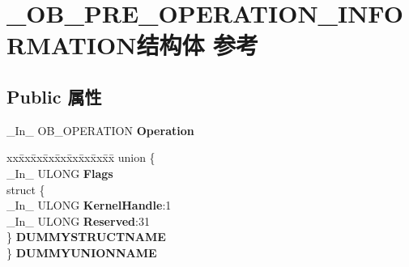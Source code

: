 \hypertarget{struct___o_b___p_r_e___o_p_e_r_a_t_i_o_n___i_n_f_o_r_m_a_t_i_o_n}{}\section{\+\_\+\+O\+B\+\_\+\+P\+R\+E\+\_\+\+O\+P\+E\+R\+A\+T\+I\+O\+N\+\_\+\+I\+N\+F\+O\+R\+M\+A\+T\+I\+O\+N结构体 参考}
\label{struct___o_b___p_r_e___o_p_e_r_a_t_i_o_n___i_n_f_o_r_m_a_t_i_o_n}
\subsection*{Public 属性}
\begin{DoxyCompactItemize}
\item 
\mbox{\label{struct___o_b___p_r_e___o_p_e_r_a_t_i_o_n___i_n_f_o_r_m_a_t_i_o_n_a38646aa82e446413e5a657d1816305b7}} 
\+\_\+\+In\+\_\+ O\+B\+\_\+\+O\+P\+E\+R\+A\+T\+I\+ON {\bfseries Operation}
\item 
\mbox{\label{struct___o_b___p_r_e___o_p_e_r_a_t_i_o_n___i_n_f_o_r_m_a_t_i_o_n_af734321385d0c964e72e2d265d4ee7e9}} 
\begin{tabbing}
xx\=xx\=xx\=xx\=xx\=xx\=xx\=xx\=xx\=\kill
union \{\\
\>\_In\_ ULONG {\bfseries Flags}\\
\>struct \{\\
\>\>\_In\_ ULONG {\bfseries KernelHandle}:1\\
\>\>\_In\_ ULONG {\bfseries Reserved}:31\\
\>\} {\bfseries DUMMYSTRUCTNAME}\\
\} {\bfseries DUMMYUNIONNAME}\\


\end{tabbing}
\end{DoxyCompactItemize}

